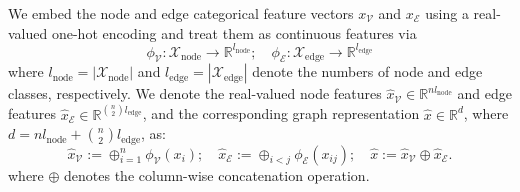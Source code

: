 We embed the node and edge categorical feature vectors $x_\mathcal{V}$ and $x_\mathcal{E}$ using a real-valued one-hot encoding and treat them as continuous features via
\[
\phi_{\mathcal{V}} :\mathcal{X}_{\mathrm{node}}\to\mathbb{R}^{l_{\mathrm{node}}};\quad
\phi_{\mathcal{E}} :\mathcal{X}_{\mathrm{edge}}\to\mathbb{R}^{l_{\mathrm{edge}}}
\]
where $l_{\mathrm{node}}=|\mathcal{X}_{\mathrm{node}}|$ and $l_{\mathrm{edge}}=|\mathcal{X}_{\mathrm{edge}}|$ denote the numbers of node and edge classes, respectively. We denote the real-valued node features $\hat{x}_{\mathcal{V}}\in\mathbb{R}^{n l_{\mathrm{node}}}$ and edge features $\hat{x}_{\mathcal{E}}\in\mathbb{R}^{\binom{n}{2}l_{\mathrm{edge}}}$, and the corresponding graph representation 
$\hat{x}\in\mathbb{R}^d$, where $d=n l_{\mathrm{node}}+\binom{n}{2}l_{\mathrm{edge}}$, as:
\begin{equation}
\hat{x}_\mathcal{V}:=\oplus_{i=1}^n \phi_\mathcal{V}(x_i);\quad
\hat{x}_\mathcal{E}:=\oplus_{i<j}\phi_\mathcal{E}(x_{ij});\quad
\hat{x}:=\hat{x}_\mathcal{V}\oplus \hat{x}_\mathcal{E}. \nonumber
\end{equation}
where $\oplus$ denotes the column-wise concatenation operation.

